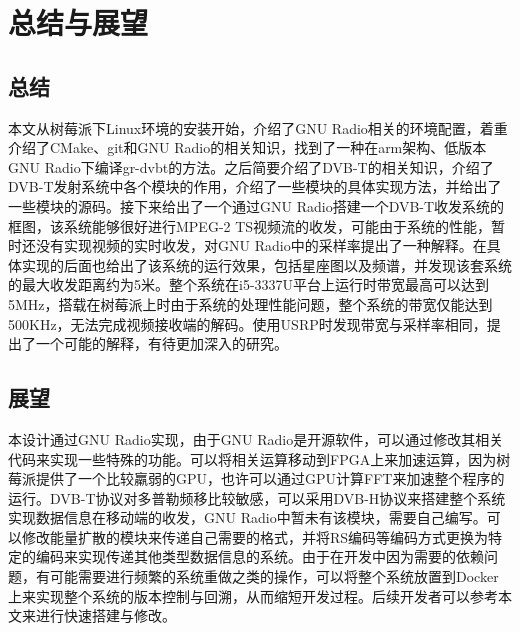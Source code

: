 \chapter{总结与展望}
	\section{总结}
	\par 本文从树莓派下Linux环境的安装开始，介绍了GNU Radio相关的环境配置，着重介绍了CMake、git和GNU Radio的相关知识，找到了一种在arm架构、低版本GNU Radio下编译gr-dvbt的方法。之后简要介绍了DVB-T的相关知识，介绍了DVB-T发射系统中各个模块的作用，介绍了一些模块的具体实现方法，并给出了一些模块的源码。接下来给出了一个通过GNU Radio搭建一个DVB-T收发系统的框图，该系统能够很好进行MPEG-2 TS视频流的收发，可能由于系统的性能，暂时还没有实现视频的实时收发，对GNU Radio中的采样率提出了一种解释。在具体实现的后面也给出了该系统的运行效果，包括星座图以及频谱，并发现该套系统的最大收发距离约为5米。整个系统在i5-3337U平台上运行时带宽最高可以达到5MHz，搭载在树莓派上时由于系统的处理性能问题，整个系统的带宽仅能达到500KHz，无法完成视频接收端的解码。使用USRP时发现带宽与采样率相同，提出了一个可能的解释，有待更加深入的研究。
	\section{展望}
	\par 本设计通过GNU Radio实现，由于GNU Radio是开源软件，可以通过修改其相关代码来实现一些特殊的功能。可以将相关运算移动到FPGA上来加速运算，因为树莓派提供了一个比较羸弱的GPU，也许可以通过GPU计算FFT来加速整个程序的运行。DVB-T协议对多普勒频移比较敏感，可以采用DVB-H协议来搭建整个系统实现数据信息在移动端的收发，GNU Radio中暂未有该模块，需要自己编写。可以修改能量扩散的模块来传递自己需要的格式，并将RS编码等编码方式更换为特定的编码来实现传递其他类型数据信息的系统。由于在开发中因为需要的依赖问题，有可能需要进行频繁的系统重做之类的操作，可以将整个系统放置到Docker上来实现整个系统的版本控制与回溯，从而缩短开发过程。后续开发者可以参考本文来进行快速搭建与修改。